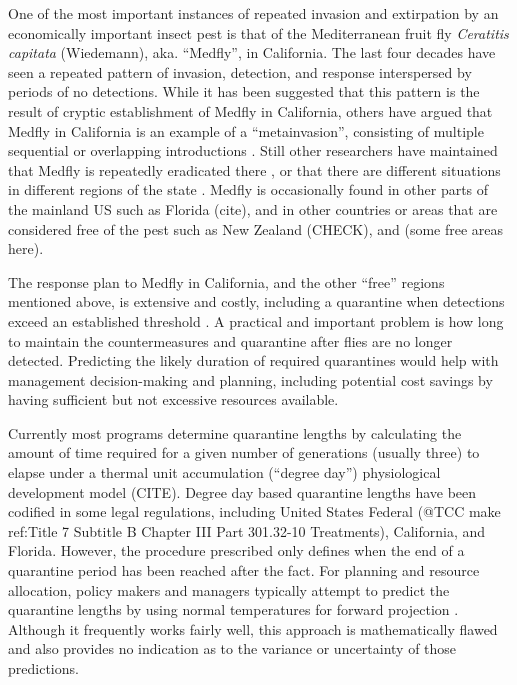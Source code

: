 \documentclass[10pt,a4paper,twocolumn]{article}
\begin{document}
One of the most important instances of repeated invasion 
and extirpation by an economically important insect pest is that of 
the Mediterranean fruit fly \textit{Ceratitis capitata} (Wiedemann), aka. ``Medfly'', 
in California.  
The last four decades have seen a repeated pattern of
invasion, detection, and response 
interspersed by periods of no detections\cite{carey_establishment_1991, papadopoulos_trickle_2013}.
While it has been suggested that this pattern is the result of
cryptic establishment of Medfly in California, 
others have argued that Medfly in California is an example of 
a ``metainvasion'', consisting of multiple sequential or
overlapping introductions \cite{davies_bioinvasions_1999}. 
Still other researchers have maintained 
that Medfly is repeatedly eradicated
there \cite{haymer_genetic_1997}, or that there are different situations
in different regions of the state
\cite{bonizzoni_microsatellite_2001,gasperi_genetic_2002}.
Medfly is occasionally found in 
other parts of the mainland US such as Florida (cite),
and in other countries or areas that are considered 
free of the pest such as New Zealand (CHECK), and (some free areas here).

The response plan to Medfly in California, and the other ``free'' 
regions mentioned above, is extensive and costly, 
including a quarantine when detections exceed an established threshold \cite{gilbert_insect_2013}.
A practical and important problem is how long to maintain 
the countermeasures and quarantine after flies are no longer detected.
Predicting the likely duration of required quarantines would help with
management decision-making and planning,
including potential cost savings by having sufficient but not excessive
resources available.

Currently most programs determine quarantine lengths 
by calculating the amount of time required for a given number 
of generations (usually three) to elapse under a thermal unit accumulation (``degree day'')
physiological development model (CITE).
Degree day based quarantine lengths have been codified in some legal
regulations, including United States Federal 
(@TCC make ref:Title 7 Subtitle B Chapter III Part 301.32-10 Treatments),
California\cite{3-CA-ADC-3406}, and Florida\cite{personal communication}.
However, the procedure prescribed only defines when the end of a
quarantine period has been reached after the fact.
For planning and resource allocation, policy makers and managers 
typically attempt to predict the quarantine lengths by using
normal temperatures for forward projection \cite{??}.
Although it frequently works fairly well,
this approach is mathematically flawed 
and also provides no indication as to the variance or uncertainty
of those predictions.
\end{document}

